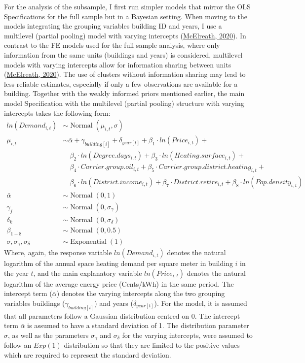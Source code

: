 \documentclass[12pt,twoside]{reedthesis}
\begin{document}
For the analysis of the subsample, I first run simpler models that mirror the OLS Specifications for the full sample but in a Bayesian setting. When moving to the models integrating the grouping variables building ID and years, I use a multilevel (partial pooling) model with varying intercepts (\protect\hyperlink{ref-mcelreath20}{McElreath, 2020}). In contrast to the FE models used for the full sample analysis, where only information from the same units (buildings and years) is considered, multilevel models with varying intercepts allow for information sharing between units (\protect\hyperlink{ref-mcelreath20}{McElreath, 2020}). The use of clusters without information sharing may lead to less reliable estimates, especially if only a few observations are available for a building. Together with the weakly informed priors mentioned earlier, the main model Specification with the multilevel (partial pooling) structure with varying intercepts takes the following form:
\begin{align*}
ln(Demand_{i,t}) & \sim \operatorname{Normal}(\mu_{i,t}, \sigma) \\
\mu_{i,t} & \sim \bar\alpha + \gamma_{building[i]} + \delta_{year[t]} + \beta_1 \cdot ln(Price_{i,t}) +  \\
 & \quad \beta_{2} \cdot ln(Degree.days_{i,t}) + \beta_{3} \cdot ln(Heating.surface_{i,t}) + \\
 & \quad \beta_{4} \cdot Carrier.group.oil_{i,t} + \beta_{5} \cdot Carrier.group.district.heating_{i,t} + \\
 & \quad \beta_{6} \cdot ln(District.income_{i,t}) + \beta_{7} \cdot District.retire_{i,t} + \beta_{8} \cdot ln(Pop.density_{i,t}) \\
\bar\alpha & \sim \operatorname{Normal}(0, 1) \\
\gamma_j & \sim \operatorname{Normal}(0, \sigma_{\gamma}) \\
\delta_k & \sim \operatorname{Normal}(0, \sigma_{\delta}) \\
\beta_{1-8} & \sim \operatorname{Normal}(0, 0.5) \\
\sigma, \sigma_{\gamma}, \sigma_{\delta} & \sim \operatorname{Exponential}(1)
\end{align*}
Where, again, the response variable \(ln(Demand_{i,t})\) denotes the natural logarithm of the annual space heating demand per square meter in building \(i\) in the year \(t\), and the main explanatory variable \(ln(Price_{i,t})\) denotes the natural logarithm of the average energy price (Cents/kWh) in the same period. The intercept term (\(\bar \alpha\)) denotes the varying intercepts along the two grouping variables buildings (\(\gamma_{building[i]}\)) and years (\(\delta_{year[t]}\)). For the model, it is assumed that all parameters follow a Gaussian distribution centred on 0. The intercept term \(\bar \alpha\) is assumed to have a standard deviation of 1. The distribution parameter \(\sigma\), as well as the parameters \(\sigma_{\gamma}\) and \(\sigma_{\delta}\) for the varying intercepts, were assumed to follow an \(Exp(1)\) distribution so that they are limited to the positive values which are required to represent the standard deviation.
\end{document}
